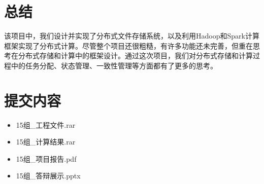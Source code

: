 \documentclass[12pt,a4paper]{article}
\begin{document}
\section{总结}
该项目中，我们设计并实现了分布式文件存储系统，以及利用Hadoop和Spark计算框架实现了分布式计算。尽管整个项目还很粗糙，有许多功能还未完善，但重在思考在分布式存储和计算中的框架设计。通过这次项目，我们对分布式存储和计算过程中的任务分配、状态管理、一致性管理等方面都有了更多的思考。

\section{提交内容}
\begin{itemize}
\item 15组\_工程文件.rar
\item 15组\_计算结果.rar
\item 15组\_项目报告.pdf
\item 15组\_答辩展示.pptx
\end{itemize}
\end{document}
